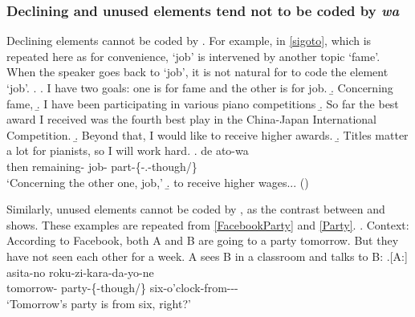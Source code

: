 \subsubsection{Declining and unused elements tend not to be coded by \textit{wa}}\label{Par:Wa:DecUnusedWa}

Declining elements cannot be coded by .
For example, in \ref{sigoto}, which is repeated here as \Next for convenience,
`job' is intervened by another topic `fame'.
When the speaker goes back to `job',
it is not natural for  to code the element `job'.
%
\ex.
 \a. I have two goals: one is for fame and the other is for job.
 \b. Concerning fame,
 \b. I have been participating in various piano competitions
 \b. So far the best award I received was the fourth best play in the China-Japan International Competition.
 \b. Beyond that, I would like to receive higher awards.
 \b. Titles matter a lot for pianists, so I will work hard.
 \bg. de ato-wa   \\
 	then remaining- job- part-\{-.-though/\} \\
	`Concerning the other one, job,'
 \b. to receive higher wages...
\hfill{()}
%

Similarly,
unused elements cannot be coded by ,
as the contrast between \Next and \NNext shows.
These examples are repeated from \ref{FacebookParty} and \ref{Party}.
%
\ex. Context: According to Facebook, both A and B are going to a party tomorrow. But they have not seen each other for a week. A sees B in a classroom and talks to B:
	\a.[A:] asita-no  roku-zi-kara-da-yo-ne \\
		tomorrow- party-\{-though/\} six-o'clock-from--\ab{fp}- \\
		`Tomorrow's party is from six, right?' 

